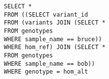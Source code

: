 \documentclass{article}
\begin{document}
\begin{tabbing}
\texttt{SELECT *} 
\\\texttt{FROM ((}\=\texttt{SELECT variant\_id }
\\ \> \texttt{FROM (variants JOIN (}\=\texttt{SELECT * }
\\ \>\>\texttt{FROM genotypes }
\\ \>\>\texttt{WHERE sample\_name == bruce)) }
\\ \> \texttt{WHERE hom\_ref) JOIN (}\=\= \texttt{SELECT * }
					\\ \>\>\> \texttt{FROM genotypes }
					\\ \>\>\> \texttt{WHERE sample\_name == bob))}
\\ \texttt{WHERE genotype = hom\_alt}

\end{tabbing}
\end{document}
